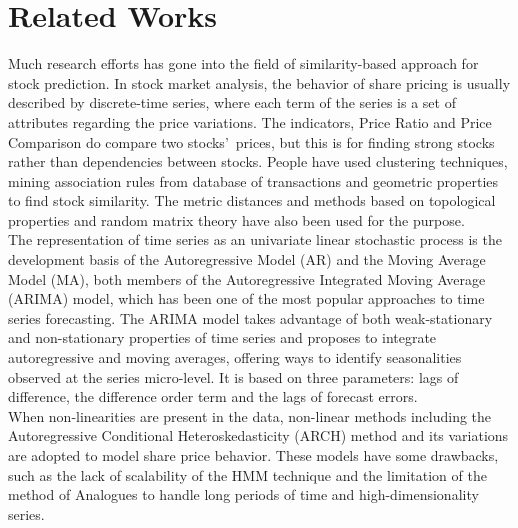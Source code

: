 \documentclass[10pt, conference, compsocconf]{IEEEtran}
\begin{document}

\section{Related Works}


Much research efforts has gone into the field of similarity-based approach for stock prediction. In stock market analysis, the behavior of share pricing is usually described by discrete-time series, where each term of the series is a set of attributes regarding the price variations\cite{Similarity}. The indicators, Price Ratio and Price Comparison do compare two stocks\rq\  prices, but this is for finding strong stocks rather than dependencies between stocks. People have used clustering techniques\cite{Which}, mining association rules from database of transactions\cite{Mining} and geometric properties\cite{Principles}\cite{Time} to find stock similarity. The metric distances and methods based on topological properties and random matrix theory have also been used for the purpose.\\

The representation of time series as an univariate linear stochastic process is the development basis of the Autoregressive Model (AR) and the Moving Average Model (MA), both members of the Autoregressive Integrated Moving Average (ARIMA) model\cite{Econometric}, which has been one of the most popular approaches to time series forecasting. The ARIMA model takes advantage of both weak-stationary and non-stationary properties of time series and proposes to integrate autoregressive and moving averages, offering ways to identify seasonalities observed at the series micro-level. It is based on three parameters: lags of difference, the difference order term and the lags of forecast errors.\\

When non-linearities are present in the data, non-linear methods including the Autoregressive Conditional Heteroskedasticity (ARCH) method and its variations are adopted to model share price behavior\cite{Arch}. These models have some drawbacks, such as the lack of scalability of the HMM technique and the limitation of the method of Analogues to handle long periods of time and high-dimensionality series.\\
\end{document}
